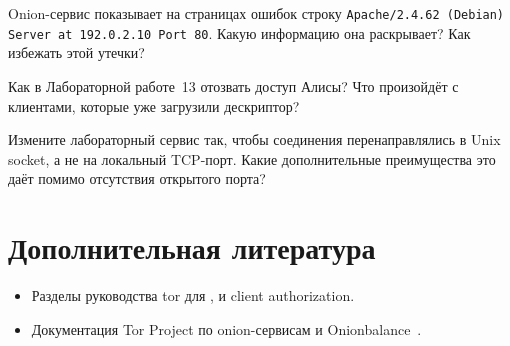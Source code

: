 \begin{esercizio}[2]\label{es:21-fuga}
Onion-сервис показывает на страницах ошибок строку \texttt{Apache/2.4.62 (Debian) Server at 192.0.2.10 Port 80}. Какую информацию она раскрывает? Как избежать этой утечки?
\end{esercizio}

\begin{esercizio}[2]\label{es:21-revoca}
Как в Лабораторной работе~13 отозвать доступ Алисы? Что произойдёт с клиентами, которые уже загрузили дескриптор?
\end{esercizio}

\begin{esercizio}[3]\label{es:21-socket}
Измените лабораторный сервис так, чтобы соединения перенаправлялись в Unix socket, а не на локальный TCP-порт. Какие дополнительные преимущества это даёт помимо отсутствия открытого порта?
\end{esercizio}

\section*{Дополнительная литература}
\begin{itemize}
  \item Разделы руководства tor для ,  и client authorization.
  \item Документация Tor Project по onion-сервисам и Onionbalance~\cite{onionbalance}.
\end{itemize}
